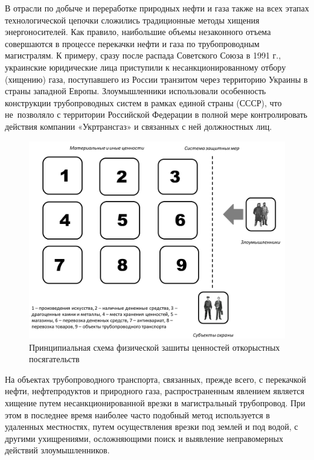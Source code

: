 \documentclass[a4paper,12pt,fleqn]{article} %
\begin{document}
В отрасли по добыче и переработке природных нефти и газа также на всех этапах технологической цепочки сложились традиционные методы хищения энергоносителей. Как правило, наибольшие объемы незаконного отъема совершаются в процессе перекачки нефти и газа по трубопроводным магистралям. К примеру, сразу после распада Советского Союза в 1991 г., украинские юридические лица приступили к несанкционированному отбору (хищению) газа, поступавшего из России транзитом через территорию Украины в страны западной Европы. Злоумышленники использовали особенность конструкции трубопроводных систем в рамках единой страны (СССР), что не~позволяло с территории Российской Федерации в полной мере контролировать действия компании «Укртрансгаз» и связанных с ней должностных лиц. 

\begin{figure}[h]
	\centering
	\includegraphics[scale=0.7]{img3}
	\caption{Принципиальная схема физической зашиты ценностей откорыстных посягательств}
	\label{image3}
\end{figure}

На объектах трубопроводного транспорта, связанных, прежде всего, с перекачкой нефти, нефтепродуктов и природного газа, распространенным явлением является хищение путем несанкционированной врезки в магистральный трубопровод. При этом в последнее время наиболее часто подобный метод используется в удаленных местностях, путем осуществления врезки под землей и под водой, с другими ухищрениями, осложняющими поиск и выявление неправомерных действий злоумышленников.
\end{document}
